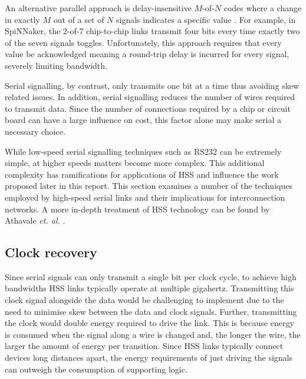 		An alternative parallel approach is delay-insensitive $M$-of-$N$ codes where
		a change in exactly $M$ out of a set of $N$ signals indicates a specific
		value \cite{bainbridge03}. For example, in SpiNNaker, the 2-of-7
		chip-to-chip links transmit four bits every time exactly two of the seven
		signals toggles.  Unfortunately, this approach requires that every value be
		acknowledged meaning a round-trip delay is incurred for every signal,
		severely limiting bandwidth.
		
		Serial signalling, by contrast, only transmits one bit at a time thus
		avoiding skew related issues. In addition, serial signalling reduces the
		number of wires required to transmit data. Since the number of
		connections required by a chip or circuit board can have a large influence
		on cost, this factor alone may make serial a necessary choice.
		
		While low-speed serial signalling techniques such as RS232 can be extremely
		simple, at higher speeds matters become more complex. This additional
		complexity has ramifications for applications of HSS and influence the work
		proposed later in this report. This section examines a number of the
		techniques employed by high-speed serial links and their implications for
		interconnection networks. A more in-depth treatment of HSS technology can be
		found by Athavale \emph{et. al.} \cite{athavale05}.
		
		\subsection{Clock recovery}
			
			
			Since serial signals can only transmit a single bit per clock cycle, to
			achieve high bandwidths HSS links typically operate at multiple gigahertz.
			Transmitting this clock signal alongside the data would be challenging to
			implement due to the need to minimise skew between the data and clock
			signals. Further, transmitting the clock would double energy required to
			drive the link. This is because energy is consumed when the signal along a
			wire is changed and, the longer the wire, the larger the amount of energy
			per transition. Since HSS links typically connect devices long distances
			apart, the energy requirements of just driving the signals can outweigh
			the consumption of supporting logic.
			
